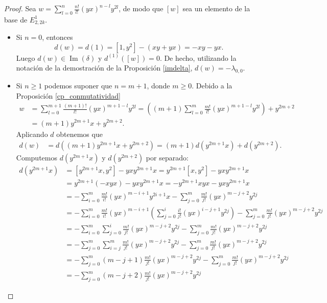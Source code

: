 \documentclass[a4paper,oneside,fleqn,11pt]{article}
\numberwithin{prop}{subsection}
\DeclareMathOperator\Ima{Im}
\begin{document}
\begin{proof}
	Sea $w = \sum_{l = 0}^n \frac{n!}{l!}(yx)^{n - l}y^{2l}$, de modo que $[w]$ sea un elemento de la base de $E_{2,2k}^1$.
	\begin{itemize}
		\item Si $n = 0$, entonces
			\[
				d(w) = d(1) = \left[1, y^2 \right] - (xy + yx) = -xy -yx.			
			\]
			Luego $d(w) \in \Ima(\delta)$ y $d^{(1)}(\left[w\right]) = 0$. De hecho, utilizando la notación de la demostración de la Proposición \ref{imdelta},
			$d(w) = -\lambda_{0,0}$.
		\item Si $n \geq 1$ podemos suponer que $n = m + 1$, donde $m \geq 0$. Debido a la Proposición \ref{cp_conmutatividad}
			\begin{align*}
				w &= \sum_{l = 0}^{m + 1} \frac{(m + 1)!}{l!}(yx)^{m + 1 - l}y^{2l}
					= \left((m + 1)\sum_{l = 0}^m\frac{m!}{l!}(yx)^{m + 1 - l}y^{2l}\right) + y^{2m + 2} \\
				&= (m + 1)y^{2m + 1}x + y^{2m + 2}.
			\end{align*}	
			Aplicando $d$ obtenemos que
			\begin{align*}
				d(w) &= d((m + 1)y^{2m + 1}x + y^{2m + 2}) = (m + 1)d(y^{2m + 1}x) + d(y^{2m + 2}).		
			\end{align*}
			Computemos $d(y^{2m + 1}x)$ y $d(y^{2m + 2})$ por separado:
			\begin{align*}
				d(y^{2m + 1}x) &= \left[y^{2m + 1}x, y^2\right] - yxy^{2m + 1}x = y^{2m + 1}\left[x,y^2\right] - yxy^{2m + 1}x\\
				&= y^{2m + 1}(-xyx) - yxy^{2m + 1}x = -y^{2m + 1}xyx - yxy^{2m + 1}x\\
				&= -\sum_{i = 0}^m\frac{m!}{i!}(yx)^{m -i + 1}y^{2i +1}x - \sum_{j = 0}^{m}\frac{m!}{j!}(yx)^{m -j + 2}y^{2j} \\
				&= -\sum_{i = 0}^m\frac{m!}{i!}(yx)^{m -i + 1}\left(\sum_{j = 0}^{i}\frac{i!}{j!}(yx)^{i - j + 1}y^{2j}\right)
					- \sum_{j = 0}^{m}\frac{m!}{j!}(yx)^{m -j + 2}y^{2j} \\
				&= -\sum_{i = 0}^m\sum_{j = 0}^i\frac{m!}{j!}(yx)^{m -j + 2}y^{2j}
					- \sum_{j = 0}^{m}\frac{m!}{j!}(yx)^{m -j + 2}y^{2j} \\
				&= -\sum_{j = 0}^m\sum_{i = j}^m\frac{m!}{j!}(yx)^{m -j + 2}y^{2j}
					- \sum_{j = 0}^{m}\frac{m!}{j!}(yx)^{m -j + 2}y^{2j} \\
				&= -\sum_{j = 0}^m(m - j + 1)\frac{m!}{j!}(yx)^{m -j + 2}y^{2j}
					- \sum_{j = 0}^{m}\frac{m!}{j!}(yx)^{m -j + 2}y^{2j} \\
				&= -\sum_{j = 0}^m(m - j + 2)\frac{m!}{j!}(yx)^{m -j + 2}y^{2j}

\end{align*}
\end{itemize}
\end{proof}
\end{document}
